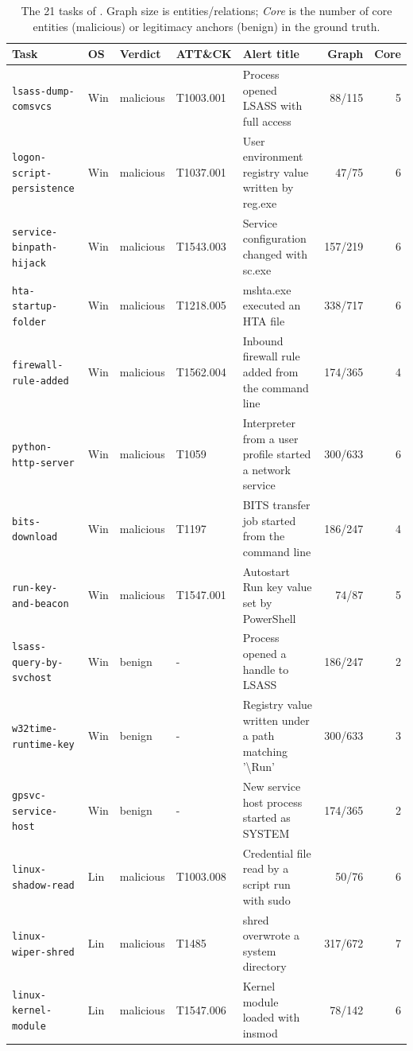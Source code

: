 \begin{table}[t]\centering\scriptsize
\caption{The 21 tasks of \bench. Graph size is entities/relations; \emph{Core} is the number of core entities (malicious) or legitimacy anchors (benign) in the ground truth.}
\label{tab:tasks}
\begin{tabular}{@{}lllllrr@{}}\toprule
Task & OS & Verdict & ATT\&CK & Alert title & Graph & Core\\\midrule
\texttt{lsass-dump-comsvcs} & Win & malicious & T1003.001 & Process opened LSASS with full access & 88/115 & 5\\
\texttt{logon-script-persistence} & Win & malicious & T1037.001 & User environment registry value written by reg.exe & 47/75 & 6\\
\texttt{service-binpath-hijack} & Win & malicious & T1543.003 & Service configuration changed with sc.exe & 157/219 & 6\\
\texttt{hta-startup-folder} & Win & malicious & T1218.005 & mshta.exe executed an HTA file & 338/717 & 6\\
\texttt{firewall-rule-added} & Win & malicious & T1562.004 & Inbound firewall rule added from the command line & 174/365 & 4\\
\texttt{python-http-server} & Win & malicious & T1059 & Interpreter from a user profile started a network service & 300/633 & 6\\
\texttt{bits-download} & Win & malicious & T1197 & BITS transfer job started from the command line & 186/247 & 4\\
\texttt{run-key-and-beacon} & Win & malicious & T1547.001 & Autostart Run key value set by PowerShell & 74/87 & 5\\
\texttt{lsass-query-by-svchost} & Win & benign & - & Process opened a handle to LSASS & 186/247 & 2\\
\texttt{w32time-runtime-key} & Win & benign & - & Registry value written under a path matching '\textbackslash{}Run' & 300/633 & 3\\
\texttt{gpsvc-service-host} & Win & benign & - & New service host process started as SYSTEM & 174/365 & 2\\
\texttt{linux-shadow-read} & Lin & malicious & T1003.008 & Credential file read by a script run with sudo & 50/76 & 6\\
\texttt{linux-wiper-shred} & Lin & malicious & T1485 & shred overwrote a system directory & 317/672 & 7\\
\texttt{linux-kernel-module} & Lin & malicious & T1547.006 & Kernel module loaded with insmod & 78/142 & 6\\

\end{tabular}
\end{table}
